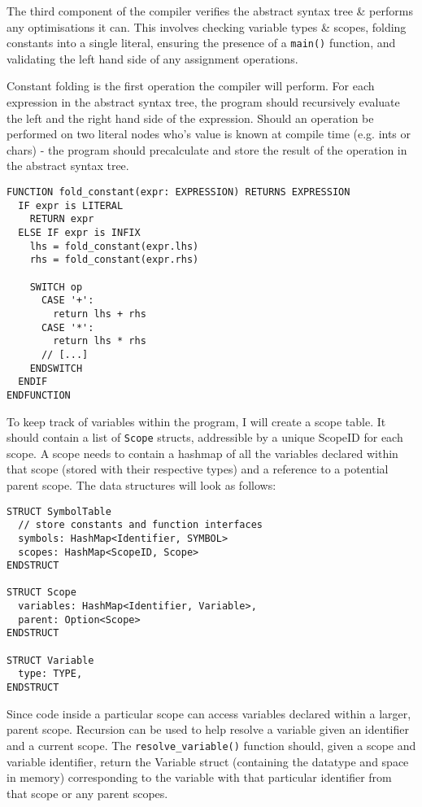 The third component of the compiler verifies the abstract syntax tree \& performs any optimisations it can. This involves checking variable types \& scopes, folding constants into a single literal, ensuring the presence of a \texttt{main()} function, and validating the left hand side of any assignment operations. 

Constant folding is the first operation the compiler will perform. For each expression in the abstract syntax tree, the program should recursively evaluate the left and the right hand side of the expression. Should an operation be performed on two literal nodes who's value is known at compile time (e.g. ints or chars) - the program should precalculate and store the result of the operation in the abstract syntax tree. 

\begin{lstlisting}
FUNCTION fold_constant(expr: EXPRESSION) RETURNS EXPRESSION
  IF expr is LITERAL 
    RETURN expr
  ELSE IF expr is INFIX 
    lhs = fold_constant(expr.lhs)
    rhs = fold_constant(expr.rhs)

    SWITCH op 
      CASE '+':
        return lhs + rhs
      CASE '*':
        return lhs * rhs
      // [...]
    ENDSWITCH 
  ENDIF
ENDFUNCTION
\end{lstlisting}

To keep track of variables within the program, I will create a scope table. It should contain a list of \texttt{Scope} structs, addressible by a unique ScopeID for each scope. A scope needs to contain a hashmap of all the variables declared within that scope (stored with their respective types) and a reference to a potential parent scope. The data structures will look as follows:

\begin{lstlisting}
STRUCT SymbolTable
  // store constants and function interfaces
  symbols: HashMap<Identifier, SYMBOL> 
  scopes: HashMap<ScopeID, Scope>
ENDSTRUCT

STRUCT Scope 
  variables: HashMap<Identifier, Variable>,
  parent: Option<Scope>
ENDSTRUCT

STRUCT Variable 
  type: TYPE,
ENDSTRUCT
\end{lstlisting}

Since code inside a particular scope can access variables declared within a larger, parent scope. Recursion can be used to help resolve a variable given an identifier and a current scope. The \texttt{resolve\_variable()} function should, given a scope and variable identifier, return the Variable struct (containing the datatype and space in memory) corresponding to the variable with that particular identifier from that scope or any parent scopes. 

